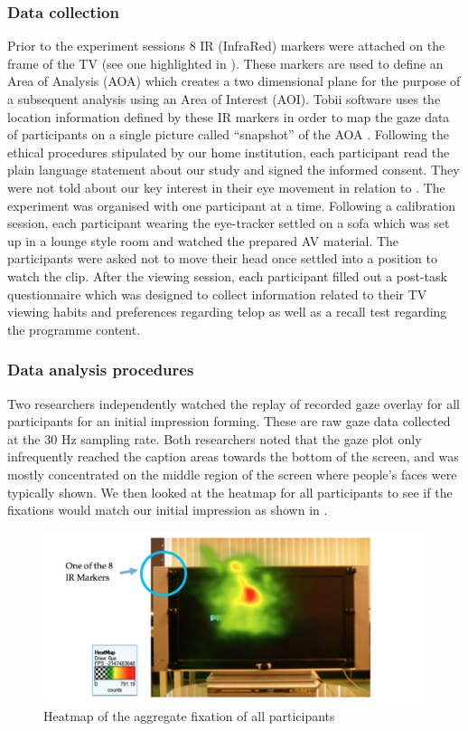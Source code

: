\documentclass[output=paper]{langsci/langscibook}
\begin{document}
\subsubsection{Data collection}

Prior to the experiment sessions 8 IR (InfraRed) markers were attached on the frame of the TV (see one highlighted in ). These markers are used to define an Area of Analysis (AOA) which creates a two dimensional plane for the purpose of a subsequent analysis using an Area of Interest (AOI).  Tobii software uses the location information defined by these IR markers in order to map the gaze data of participants on a single picture called ``snapshot'' of the AOA \citep{Tobii2012}. Following the ethical procedures stipulated by our home institution, each participant read the plain language statement about our study and signed the informed consent. They were not told about our key interest in their eye movement in relation to . The experiment was organised with one participant at a time. Following a calibration session, each participant wearing the eye-tracker settled on a sofa which was set up in a lounge style room and watched the prepared AV material.  The participants were asked not to move their head once settled into a position to watch the clip. After the viewing session, each participant filled out a post-task questionnaire which was designed to collect information related to their TV viewing habits and preferences regarding telop as well as a recall test regarding the programme content.  

\subsubsection{Data analysis procedures}

Two researchers independently watched the replay of recorded gaze overlay for all participants for an initial impression forming.  These are raw gaze data collected at the 30 Hz sampling rate.  Both researchers noted that the gaze plot only infrequently reached the caption areas towards the bottom of the screen, and was mostly concentrated on the middle region of the screen where people's faces were typically shown. We then looked at the heatmap for all participants to see if the fixations would match our initial impression as shown in . 

\begin{figure}
 \includegraphics[width=\textwidth]{figures/OHagan2.png}
 \caption{Heatmap of the aggregate fixation of all participants}
 \label{ohagan:fig:2}
\end{figure}
\end{document}
